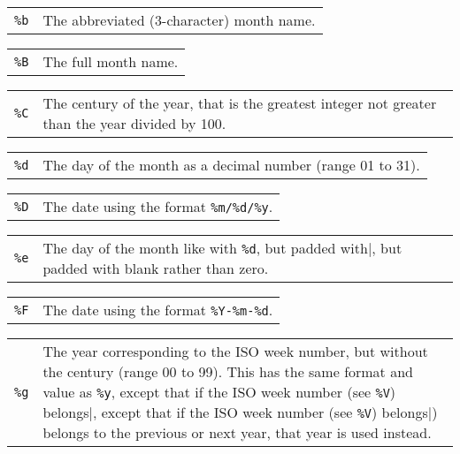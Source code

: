 \documentclass[10pt]{article}
\begin{document}
\medskip

\begin{tabular}{@{}p{20pt}p{298pt}@{}}
{\tt\%b}&The abbreviated (3-character) month name.\\
\end{tabular}

\medskip

\begin{tabular}{@{}p{20pt}p{298pt}@{}}
{\tt\%B}&The full month name.\\
\end{tabular}

\medskip

\begin{tabular}{@{}p{20pt}p{298pt}@{}}
{\tt\%C}&The century of the year, that is the greatest integer not
greater than the year divided by 100.\\
\end{tabular}

\medskip

\begin{tabular}{@{}p{20pt}p{298pt}@{}}
{\tt\%d}&The day of the month as a decimal number (range 01 to 31).\\
\end{tabular}

\medskip

\begin{tabular}{@{}p{20pt}p{298pt}@{}}
{\tt\%D}&The date using the format \verb|%m/%d/%y|.\\
\end{tabular}

\medskip

\begin{tabular}{@{}p{20pt}p{298pt}@{}}
{\tt\%e}&The day of the month like with \verb|%d|, but padded with
blank rather than zero.\\
\end{tabular}

\medskip

\begin{tabular}{@{}p{20pt}p{298pt}@{}}
{\tt\%F}&The date using the format \verb|%Y-%m-%d|.\\
\end{tabular}

\medskip

\begin{tabular}{@{}p{20pt}p{298pt}@{}}
{\tt\%g}&The year corresponding to the ISO week number, but without the
century (range 00 to 99). This has the same format and value as
\verb|%y|, except that if the ISO week number (see \verb|%V|) belongs
to the previous or next year, that year is used instead.\\
\end{tabular}
\end{document}
